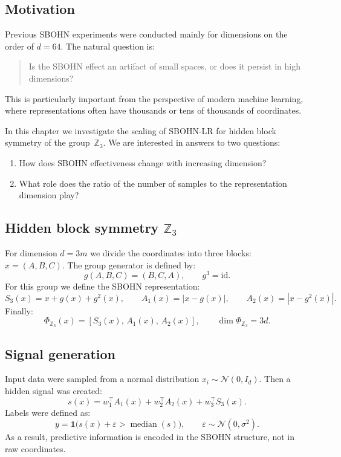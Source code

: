 \documentclass[11pt,a4paper]{report}
\begin{document}
\subsection{Motivation}

Previous SBOHN experiments were conducted mainly for dimensions on the order of $d=64$. The natural question is:

\begin{quote}
Is the SBOHN effect an artifact of small spaces, or does it persist in high dimensions?
\end{quote}

This is particularly important from the perspective of modern machine learning, where representations often have thousands or tens of thousands of coordinates.

In this chapter we investigate the scaling of SBOHN-LR for hidden block symmetry of the group~$\mathbb{Z}_3$. We are interested in answers to two questions:
\begin{enumerate}
\item How does SBOHN effectiveness change with increasing dimension?
\item What role does the ratio of the number of samples to the representation dimension play?
\end{enumerate}


\subsection{Hidden block symmetry $\mathbb{Z}_3$}

For dimension $d=3m$ we divide the coordinates into three blocks: $x=(A,B,C)$. The group generator is defined by:
\[
g(A,B,C) = (B,C,A), \qquad g^3 = \mathrm{id}.
\]
For this group we define the SBOHN representation:
\[
S_3(x) = x + g(x) + g^2(x), \qquad
A_1(x) = |x - g(x)|, \qquad
A_2(x) = |x - g^2(x)|.
\]
Finally:
\[
\Phi_{\mathbb{Z}_3}(x) = [S_3(x),\, A_1(x),\, A_2(x)], \qquad
\dim \Phi_{\mathbb{Z}_3} = 3d.
\]


\subsection{Signal generation}

Input data were sampled from a normal distribution $x_i \sim \mathcal{N}(0, I_d)$. Then a hidden signal was created:
\[
s(x) = w_1^\top A_1(x) + w_2^\top A_2(x) + w_3^\top S_3(x).
\]
Labels were defined as:
\[
y = \mathbf{1}\bigl(s(x) + \varepsilon > \operatorname{median}(s)\bigr), \qquad
\varepsilon \sim \mathcal{N}(0, \sigma^2).
\]
As a result, predictive information is encoded in the SBOHN structure, not in raw coordinates.
\end{document}
